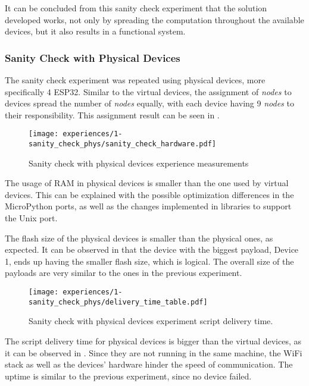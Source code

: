 It can be concluded from this sanity check experiment that the solution developed works, not only by spreading the computation throughout the available devices, but it also results in a functional system.


\subsubsection{Sanity Check with Physical Devices}\label{sec:sanity_check_phys_exp}

The sanity check experiment was repeated using physical devices, more specifically 4 ESP32. Similar to the virtual devices, the assignment of \textit{nodes} to devices spread the number of \textit{nodes} equally, with each device having 9 \textit{nodes} to their responsibility. This assignment result can be seen in .

\begin{figure}[h]
\centering
\texttt{[image: experiences/1-sanity\_check\_phys/sanity\_check\_hardware.pdf]}
\caption[Sanity check with physical devices experience measurements]{Sanity check with physical devices experience measurements}\label{fig:sanity_check_phys_graph}
\end{figure}

The usage of RAM in physical devices is smaller than the one used by virtual devices. This can be explained with the possible optimization differences in the MicroPython ports, as well as the changes implemented in libraries to support the Unix port.

The flash size of the physical devices is smaller than the physical ones, as expected. It can be observed in  that the device with the biggest payload, Device 1, ends up having the smaller flash size, which is logical. The overall size of the payloads are very similar to the ones in the previous experiment. 

\begin{figure}[h]
\centering
\texttt{[image: experiences/1-sanity\_check\_phys/delivery\_time\_table.pdf]}
\caption[Sanity check with physical devices experiment script delivery time.]{Sanity check with physical devices experiment script delivery time.}\label{fig:sanity_check_phys_delivery_time}
\end{figure}

The script delivery time for physical devices is bigger than the virtual devices, as it can be observed in . Since they are not running in the same machine, the WiFi stack as well as the devices' hardware hinder the speed of communication. The uptime is similar to the previous experiment, since no device failed.

